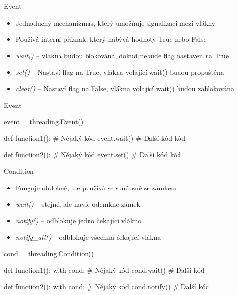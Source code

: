 \documentclass{beamer}
\begin{document}
\begin{frame}{Event}
    \begin{itemize}
        \item Jednoduchý mechanizmus, který umožňuje signalizaci mezi vlákny
        \item Používá interní příznak, který nabývá hodnoty True nebo False
        \vskip 0.25in

        \item \textit{wait()} – vlákna budou blokována, dokud nebude flag nastaven na True
        \item \textit{set()} – Nastaví flag na True, vlákna volající wait() budou propuštěna
        \item \textit{clear()} – Nastaví flag na False, vlákna volající wait() budou zablokována
    \end{itemize}
\end{frame}

\begin{frame}[fragile]{Event}
    \begin{semiverbatim}
    event = threading.Event()

    def function1():
    	# Nějaký kód
    	event.wait()
    	# Další kód kód
    
    def function2():
    	# Nějaký kód
    	event.set()
    	# Další kód kód    
    \end{semiverbatim}
\end{frame}

\begin{frame}[fragile]{Condition}
    \begin{itemize}
        \item Funguje obdobně, ale používá se současně se zámkem

        \vskip 0.25in
        \item \textit{wait()} – stejné, ale navíc odemkne zámek
        \item \textit{notify()} – odblokuje jedno čekající vlákno
        \item \textit{notify\_all()} – odblokuje všechna čekající vlákna
    \end{itemize}
    \scriptsize
    \begin{semiverbatim}
    cond = threading.Condition()

    def function1():
    	with cond:
    		# Nějaký kód
    		cond.wait()
    		# Další kód
    
    def function2():
    	with cond:
    		# Nějaký kód
    		cond.notify()
    		# Další kód
    \end{semiverbatim}
\end{frame}
\end{document}
